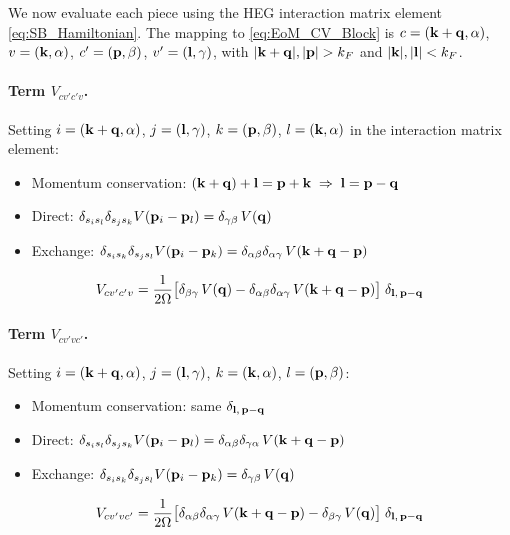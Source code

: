 \documentclass[11pt,letterpaper]{article}
\theoremstyle{definition}
\theoremstyle{plain}
\theoremstyle{remark}
\begin{document}
We now evaluate each piece using the HEG interaction matrix element \eqref{eq:SB_Hamiltonian}. The mapping to \eqref{eq:EoM_CV_Block} is $c = (\vb{k}+\vb{q}, \alpha)$, $v = (\vb{k}, \alpha)$, $c' = (\vb{p}, \beta)$, $v' = (\vb{l}, \gamma)$, with $\abs{\vb{k}+\vb{q}}, \abs{\vb{p}} > k_F$ and $\abs{\vb{k}}, \abs{\vb{l}} < k_F$.

\paragraph{Term $V_{cv'c'v}$.}
Setting $i = (\vb{k}+\vb{q}, \alpha)$, $j = (\vb{l}, \gamma)$, $k = (\vb{p}, \beta)$, $l = (\vb{k}, \alpha)$ in the interaction matrix element:
\begin{itemize}
    \item Momentum conservation: $(\vb{k}+\vb{q}) + \vb{l} = \vb{p} + \vb{k} \;\Rightarrow\; \vb{l} = \vb{p} - \vb{q}$
    \item Direct: $\delta_{s_i s_l}\delta_{s_j s_k} V(\vb{p}_i - \vb{p}_l) = \delta_{\gamma \beta}\, V(\vb{q})$
    \item Exchange: $\delta_{s_i s_k}\delta_{s_j s_l} V(\vb{p}_i - \vb{p}_k) = \delta_{\alpha \beta}\delta_{\alpha \gamma}\, V(\vb{k}+\vb{q}-\vb{p})$
\end{itemize}
\begin{gather}
    V_{cv'c'v} = \frac{1}{2\Omega}\bigl[\delta_{\beta\gamma}\,V(\vb{q}) - \delta_{\alpha\beta}\delta_{\alpha\gamma}\,V(\vb{k}+\vb{q}-\vb{p})\bigr]\;\delta_{\vb{l},\,\vb{p}-\vb{q}}
\end{gather}

\paragraph{Term $V_{cv'vc'}$.}
Setting $i = (\vb{k}+\vb{q}, \alpha)$, $j = (\vb{l}, \gamma)$, $k = (\vb{k}, \alpha)$, $l = (\vb{p}, \beta)$:
\begin{itemize}
    \item Momentum conservation: same $\delta_{\vb{l},\,\vb{p}-\vb{q}}$
    \item Direct: $\delta_{s_i s_l}\delta_{s_j s_k} V(\vb{p}_i - \vb{p}_l) = \delta_{\alpha\beta}\delta_{\gamma\alpha}\,V(\vb{k}+\vb{q}-\vb{p})$
    \item Exchange: $\delta_{s_i s_k}\delta_{s_j s_l} V(\vb{p}_i - \vb{p}_k) = \delta_{\gamma\beta}\,V(\vb{q})$
\end{itemize}
\begin{gather}
    V_{cv'vc'} = \frac{1}{2\Omega}\bigl[\delta_{\alpha\beta}\delta_{\alpha\gamma}\,V(\vb{k}+\vb{q}-\vb{p}) - \delta_{\beta\gamma}\,V(\vb{q})\bigr]\;\delta_{\vb{l},\,\vb{p}-\vb{q}}
\end{gather}
\end{document}
